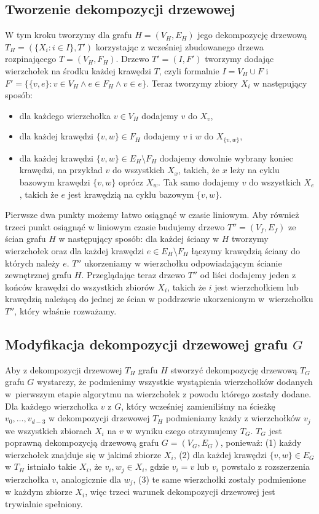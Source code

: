 \documentclass[twoside,a4paper,12pt]{report} %
\theoremstyle{break}
\begin{document}
\subsection{Tworzenie dekompozycji drzewowej}
W tym kroku tworzymy dla grafu $H=(V_H,E_H)$ jego dekompozycję drzewową $T_H=(\{X_i \colon i \in I\}, T')$ korzystając z wcześniej zbudowanego drzewa rozpinającego $T=(V_H,F_H)$. Drzewo $T'=(I, F')$ tworzymy dodając wierzchołek na środku każdej krawędzi $T$, czyli formalnie $I=V_H \cup F$ i $F'=\{\{v,e\} \colon v \in V_H \land e \in F_H \land v \in e\}$. Teraz tworzymy zbiory $X_i$ w następujący sposób:
\begin{itemize}
    \item dla każdego wierzchołka $v \in V_H$ dodajemy $v$ do $X_v$,
    \item dla każdej krawędzi $\{v,w\} \in F_H$ dodajemy $v$ i $w$ do $X_{\{v,w\}}$,
    \item dla każdej krawędzi $\{v,w\} \in E_H \setminus F_H$ dodajemy dowolnie wybrany koniec krawędzi, na przykład $v$ do wszystkich $X_x$, takich, że $x$ leży na cyklu bazowym krawędzi $\{v,w\}$ oprócz $X_w$. Tak samo dodajemy $v$ do wszystkich $X_e$, takich że $e$ jest krawędzią na cyklu bazowym $\{v,w\}$.
\end{itemize}

Pierwsze dwa punkty możemy łatwo osiągnąć w czasie liniowym. Aby również trzeci punkt osiągnąć w liniowym czasie budujemy drzewo $T''=(V_f,E_f)$ ze ścian grafu $H$ w następujący sposób: dla każdej ściany w $H$ tworzymy wierzchołek oraz dla każdej krawędzi $e \in E_H \setminus F_H$ łączymy krawędzią ściany do których należy $e$. $T''$ ukorzeniamy w wierzchołku odpowiadającym ścianie zewnętrznej grafu $H$. Przeglądając teraz drzewo $T''$ od liści dodajemy jeden z końców krawędzi do wszystkich zbiorów $X_i$, takich że $i$ jest wierzchołkiem lub krawędzią należącą do jednej ze ścian w poddrzewie ukorzenionym w~wierzchołku $T''$, który właśnie rozważamy.

\subsection[Modyfikacja dekompozycji drzewowej grafu G]{Modyfikacja dekompozycji drzewowej grafu $G$}
Aby z dekompozycji drzewowej $T_H$ grafu $H$ stworzyć dekompozycję drzewową $T_G$ grafu $G$ wystarczy, że podmienimy wszystkie wystąpienia wierzchołków dodanych w~pierwszym etapie algorytmu na wierzchołek z powodu którego zostały dodane. Dla każdego wierzchołka $v$ z $G$, który wcześniej zamieniliśmy na ścieżkę $v_0,\dots,v_{d-3}$ w dekompozycji drzewowej $T_H$ podmieniamy każdy z wierzchołków $v_j$ we wszystkich zbiorach $X_i$ na $v$ w wyniku czego otrzymujemy $T_G$. $T_G$ jest poprawną dekompozycją drzewową grafu $G=(V_G,E_G)$, ponieważ: (1) każdy wierzchołek znajduje się w jakimś zbiorze $X_i$, (2) dla każdej krawędzi $\{v,w\} \in E_G$ w $T_H$ istniało takie $X_i$, że $v_i,w_j \in X_i$, gdzie $v_i = v$ lub $v_i$ powstało z rozszerzenia wierzchołka $v$, analogicznie dla $w_j$, (3) te same wierzchołki zostały podmienione w każdym zbiorze $X_i$, więc trzeci warunek dekompozycji drzewowej jest trywialnie spełniony.
\end{document}
